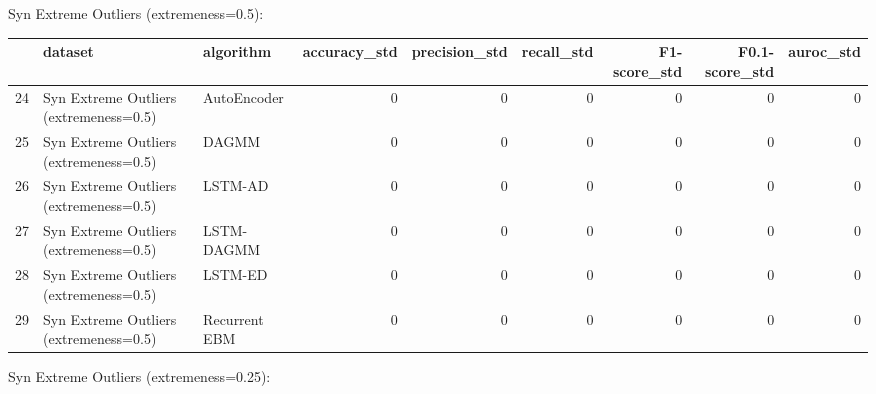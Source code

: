 Syn Extreme Outliers (extremeness=0.5):

\begin{tabular}{rllrrrrrr}
\hline
    & dataset                                & algorithm     &   accuracy\_std &   precision\_std &   recall\_std &   F1-score\_std &   F0.1-score\_std &   auroc\_std \\
\hline
 24 & Syn Extreme Outliers (extremeness=0.5) & AutoEncoder   &              0 &               0 &            0 &              0 &                0 &           0 \\
 25 & Syn Extreme Outliers (extremeness=0.5) & DAGMM         &              0 &               0 &            0 &              0 &                0 &           0 \\
 26 & Syn Extreme Outliers (extremeness=0.5) & LSTM-AD       &              0 &               0 &            0 &              0 &                0 &           0 \\
 27 & Syn Extreme Outliers (extremeness=0.5) & LSTM-DAGMM    &              0 &               0 &            0 &              0 &                0 &           0 \\
 28 & Syn Extreme Outliers (extremeness=0.5) & LSTM-ED       &              0 &               0 &            0 &              0 &                0 &           0 \\
 29 & Syn Extreme Outliers (extremeness=0.5) & Recurrent EBM &              0 &               0 &            0 &              0 &                0 &           0 \\
\hline
\end{tabular}

Syn Extreme Outliers (extremeness=0.25):

